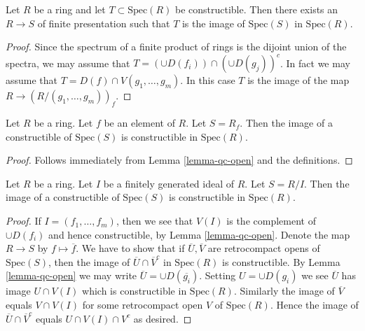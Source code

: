 \begin{lemma}
\label{lemma-constructible-is-image}
Let $R$ be a ring and let $T \subset \text{Spec}(R)$
be constructible. Then there exists an $R \to S$ of
finite presentation such that $T$ is the image of
$\text{Spec}(S)$ in $\text{Spec}(R)$.
\end{lemma}

\begin{proof}
Since the spectrum of a finite product of rings 
is the dijoint union of the spectra, we may assume
that $T = (\cup D(f_i)) \cap (\cup D(g_j))^c$.
In fact we may assume that $T = D(f) \cap V(g_1,\ldots,g_m)$.
In this case $T$ is the image of the map
$R \to (R/(g_1,\ldots,g_m))_f$.
\end{proof}

\begin{lemma}
\label{lemma-open-fp}
Let $R$ be a ring.
Let $f$ be an element of $R$.
Let $S = R_f$.
Then the image of a constructible of $\text{Spec}(S)$
is constructible in $\text{Spec}(R)$.
\end{lemma}

\begin{proof}
Follows immediately from Lemma \ref{lemma-qc-open} and the
definitions.
\end{proof}

\begin{lemma}
\label{lemma-closed-fp}
Let $R$ be a ring.
Let $I$ be a finitely generated ideal of $R$.
Let $S = R/I$.
Then the image of a constructible of $\text{Spec}(S)$
is constructible in $\text{Spec}(R)$.
\end{lemma}

\begin{proof}
If $I = (f_1,\ldots,f_m)$, then we see that
$V(I)$ is the complement of $\cup D(f_i)$ and
hence constructible, by Lemma \ref{lemma-qc-open}.
Denote the map $R \to S$ by $f \mapsto \overline{f}$.
We have to show that if $\overline{U}, \overline{V}$
are retrocompact opens of $\text{Spec}(S)$, then the
image of $\overline{U} \cap \overline{V}^c$
in $\text{Spec}(R)$ is constructible.
By Lemma \ref{lemma-qc-open} we may write
$\overline{U} = \cup D(\overline{g_i})$.
Setting ${U} = \cup D({g_i})$ we see $\overline{U}$
has image $U \cap V(I)$ which is constructible in
$\text{Spec}(R)$. Similarly the image of $\overline{V}$ equals
$V \cap V(I)$ for some retrocompact open $V$ of $\text{Spec}(R)$.
Hence the image of $\overline{U} \cap \overline{V}^c$
equals $U \cap V(I) \cap V^c$ as desired.
\end{proof}

